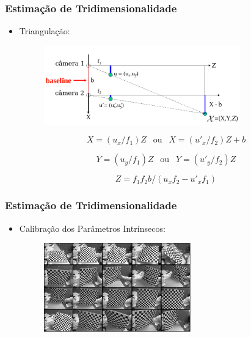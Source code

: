 \documentclass[brazil]{beamer}
\begin{document}
\begin{frame}
\frametitle{Estimação de Tridimensionalidade}
  \begin{itemize}
      \item Triangulação:
      
      \begin{figure}
        \centering
        \includegraphics[width = 0.8\textwidth, keepaspectratio]{./img/TG_triangulation_pdf_washington_pt2.png}
      \end{figure}
      \begin{equation}
      X = (u_x/f_1)  Z \ \  \text{	ou	  }\  \ X = (u'_x/f_2)  Z + b 
      \end{equation}
      
      \begin{equation}
      Y = (u_y/f_1) Z \ \  \text{	ou	  }\  \ Y = (u'_y/f_2) Z
	  \end{equation}      
      
      \begin{equation}
      Z = f_1  f_2  b / (u_x  f_2 - u'_x  f_1)
	  \end{equation}      
      
  \end{itemize} 
\end{frame}

\begin{frame}
\frametitle{Estimação de Tridimensionalidade}
  \begin{itemize}
      \item Calibração dos Parâmetros Intrínsecos:
      \begin{figure}
        \centering
        \includegraphics[width = 0.6\textwidth, keepaspectratio]{./img/TG_calib_images.png}
      \end{figure}
  \end{itemize} 
\end{frame}
\end{document}
